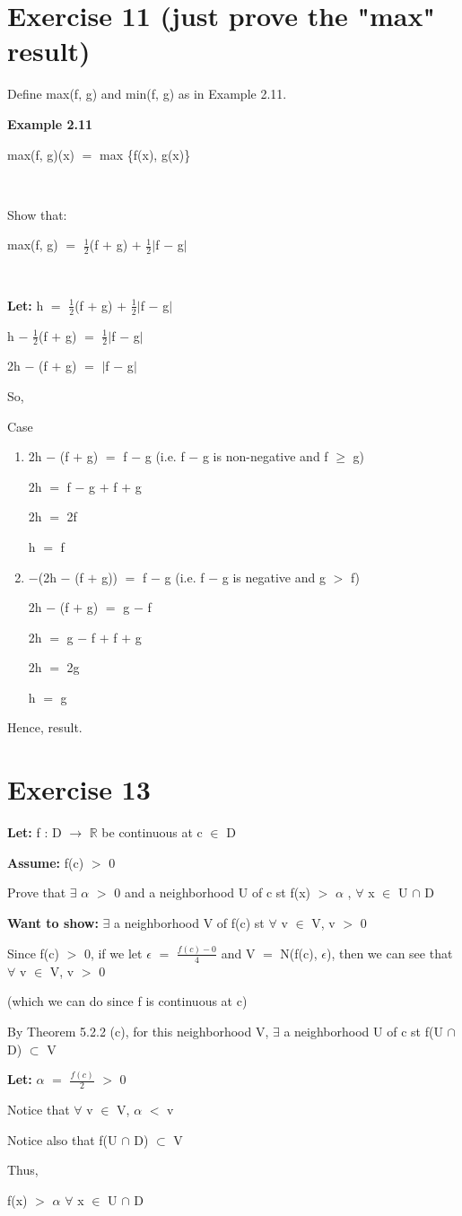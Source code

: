 \documentclass{article}
\newcommand{\mt}[1]{\ensuremath{#1}}
\newcommand\bsc[2][\DefaultOpt]{%
  \def\DefaultOpt{#2}%
  \section[#1]{#2}%
}
\newcommand{\elist}{\end{enumerate}}
\newcommand{\bilist}{\begin{enumerate}[label=\roman*)]}
\newcommand{\lt}[1]{\textbf{Let: } #1}
\newcommand{\wts}[1]{\textbf{Want to show: } #1}
\newcommand{\as}[1]{\textbf{Assume: } #1}
\newcommand{\br}{\mt{\mathbb{R}} }       %
\newcommand{\ep}{\mt{\epsilon} }         %
\newcommand{\fa}{\mt{\forall} }          %
\newcommand{\afa}{\mt{\alpha} }
\newcommand{\mem}{\mt{\in} }
\newcommand{\exs}{\mt{\exists} }
\newcommand{\sbs}{\mt{\subset} }         %
\newcommand{\lra}{ \mt{\longrightarrow} } %
\newcommand{\av}[1]{\mt{|}#1\mt{|}}  %
\newcommand{\bk}[1]{\{#1\}}
\newcommand{\ps}{\mt{+} }
\newcommand{\ms}{\mt{-} }
\newcommand{\ls}{\mt{<} }
\newcommand{\gr}{\mt{>} }
\newcommand{\gre}{\mt{\geq} }
\newcommand{\eql}{\mt{=} }
\newcommand{\frc}[2]{\mt{\frac{#1}{#2}}}
\newcommand{\inn}{\mt{\cap} }
\begin{document}
\bsc{Exercise 11 (just prove the "max" result)}{

Define max(f, g) and min(f, g) as in Example 2.11. 

\textbf{Example 2.11}

max(f, g)(x) \eql max \bk{f(x), g(x)}

\

Show that:

max(f, g) \eql \frc{1}{2}(f \ps g) \ps \frc{1}{2}\av{f \ms g}

\

\lt{h \eql \frc{1}{2}(f \ps g) \ps \frc{1}{2}\av{f \ms g}}

h \ms \frc{1}{2}(f \ps g) \eql \frc{1}{2}\av{f \ms g}

2h \ms (f \ps g) \eql \av{f \ms g}

So,

Case
\bilist
\item 2h \ms (f \ps g) \eql f \ms g (i.e. f \ms g is non-negative and f \gre g)

	2h \eql f \ms g \ps f \ps g
	
	2h \eql 2f
	
	h \eql f
\item $-$(2h \ms (f \ps g)) \eql f \ms g (i.e. f \ms g is negative and g \gr f)
	
	2h \ms (f \ps g) \eql g \ms f
	
	2h \eql g \ms f \ps f \ps g
	
	2h \eql 2g
	
	h \eql g
\elist

Hence, result.

}

\bsc{Exercise 13}{

\lt{f : D \lra \br be continuous at c \mem D}

\as{f(c) \gr 0}

Prove that \exs \afa \gr 0 and a neighborhood U of c st f(x) \gr \afa, \fa x \mem U \inn D

\wts{\exs a neighborhood V of f(c) st \fa v \mem V, v \gr 0}

Since f(c) \gr 0, if we let \ep \eql \frc{f(c) \ms 0}{4} and V \eql N(f(c), $\epsilon$), then we can see that \fa v \mem V, v \gr 0

(which we can do since f is continuous at c)

By Theorem 5.2.2 (c), for this neighborhood V, \exs a neighborhood U of c st f(U \inn D) \sbs V

\lt{\afa \eql \frc{f(c)}{2} \gr 0}

Notice that \fa v \mem V, \afa \ls v

Notice also that f(U \inn D) \sbs V

Thus,

f(x) \gr \afa \fa x \mem U \inn D

}
\end{document}
